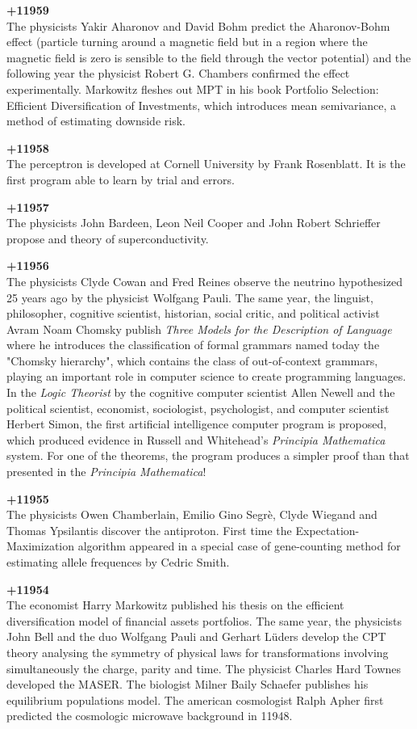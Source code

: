 \textbf{+11959}\\
The physicists Yakir Aharonov and David Bohm predict the Aharonov-Bohm effect (particle turning around a magnetic field but in a region where the magnetic field is zero is sensible to the field through the vector potential) and the following year the physicist Robert G. Chambers confirmed the effect experimentally. Markowitz fleshes out MPT in his book Portfolio Selection: Efficient Diversification of Investments, which introduces mean semivariance, a method of estimating downside risk.

\textbf{+11958}\\
The perceptron is developed at Cornell University by Frank Rosenblatt. It is the first program able to learn by trial and errors.

\textbf{+11957}\\
The physicists John Bardeen, Leon Neil Cooper and John Robert Schrieffer propose and theory of superconductivity.

\textbf{+11956}\\
The physicists Clyde Cowan and Fred Reines observe the neutrino hypothesized 25 years ago by the physicist Wolfgang Pauli. The same year, the  linguist, philosopher, cognitive scientist, historian, social critic, and political activist Avram Noam Chomsky publish \textit{Three Models for the Description of Language} where he introduces the classification of formal grammars named today the "Chomsky hierarchy", which contains the class of out-of-context grammars, playing an important role in computer science to create programming languages. In the \textit{Logic Theorist} by the cognitive computer scientist Allen Newell and the political scientist, economist, sociologist, psychologist, and computer scientist Herbert Simon, the first artificial intelligence computer program is proposed, which produced evidence in Russell and Whitehead's \textit{Principia Mathematica} system. For one of the theorems, the program produces a simpler proof than that presented in the \textit{Principia Mathematica}!

\textbf{+11955}\\
The physicists Owen Chamberlain, Emilio Gino Segrè, Clyde Wiegand and Thomas Ypsilantis discover the antiproton. First time the Expectation-Maximization algorithm appeared in a special case of gene-counting method for estimating allele frequences by Cedric Smith.

\textbf{+11954}\\
The economist Harry Markowitz published his thesis on the efficient diversification model of financial assets portfolios. The same year, the physicists John Bell and the duo Wolfgang Pauli and Gerhart Lüders develop the CPT theory analysing the symmetry of physical laws for transformations involving simultaneously the charge, parity and time. The physicist Charles Hard Townes developed the MASER. The biologist Milner Baily Schaefer publishes his equilibrium populations model. The american cosmologist Ralph Apher first predicted the cosmologic microwave background in 11948.

